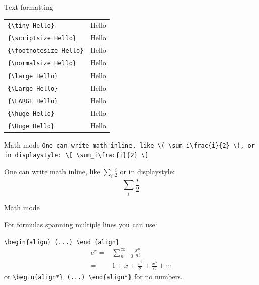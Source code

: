 \documentclass[11pt]{beamer}
\newcommand{\bs}{\textbackslash}
\begin{document}
\begin{frame}{Text formatting}
  \begin{center}
    \begin{tabular}{lc}
      \texttt{\{\bs tiny Hello\}}         & {\tiny Hello} \\
      \texttt{\{\bs scriptsize Hello\}}   & {\scriptsize Hello} \\
      \texttt{\{\bs footnotesize Hello\}} & {\footnotesize Hello} \\
      \texttt{\{\bs normalsize Hello\}}   & {\normalsize Hello} \\
      \texttt{\{\bs large Hello\}}        & {\large Hello} \\
      \texttt{\{\bs Large Hello\}}        & {\Large Hello} \\
      \texttt{\{\bs LARGE Hello\}}        & {\LARGE Hello} \\
      \texttt{\{\bs huge Hello\}}         & {\huge Hello} \\
      \texttt{\{\bs Huge Hello\}}         & {\Huge Hello} \\
    \end{tabular}
  \end{center}
\end{frame}

\begin{frame}{Math mode}
  \texttt{One can write math inline, like
          {\color{red}\bs(} \bs sum\_i\bs frac\{i\}\{2\} {\color{red}\bs)},
          or in displaystyle:
          {\color{red}\bs[} \bs sum\_i\bs frac\{i\}\{2\} {\color{red}\bs]}
         }

  \vspace{1.5cm}
  One can write math inline, like \(\sum_i\frac{i}{2}\) or in displaystyle:
  \[\sum_i\frac{i}{2}\]
\end{frame}

\begin{frame}{Math mode}
  \begin{center}
    For formulas spanning multiple lines you can use:

    \vspace{0.5cm}
    \texttt{\color{red}\bs begin\{align\} (...) \bs end \{align\}}
    \begin{align}
      e^x =& \sum_{n=0}^{\infty} \frac{x^n}{n!} \\
          =& 1 + x + \frac{x^2}{2} + \frac{x^3}{6} + \cdots
    \end{align}
    or \texttt{\color{red}\bs begin\{align*\} (...) \bs end\{align*\}} for no
    numbers.
  \end{center}
\end{frame}
\end{document}
